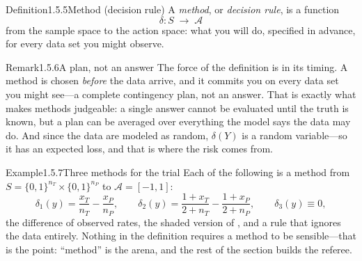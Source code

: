 \documentclass[main.tex]{subfiles}
\begin{document}
\begin{Obj}{Definition}{1.5.5}{Method (decision rule)}
A \emph{method}, or \emph{decision rule}, is a function
\[ \delta : S \;\to\; \mathcal{A} \]
from the sample space to the action space: what you will do, specified in advance, for every
data set you might observe.
\end{Obj}

\begin{ObjL}{Remark}{1.5.6}{A plan, not an answer}
The force of the definition is in its timing. A method is chosen \emph{before} the data
arrive, and it commits you on every data set you might see---a complete contingency plan, not
an answer. That is exactly what makes methods judgeable: a single answer cannot be evaluated
until the truth is known, but a plan can be averaged over everything the model says the data
may do. And since the data are modeled as random, $\delta(Y)$ is a random variable---so it has
an expected loss, and that is where the risk comes from.
\end{ObjL}

\begin{ObjL}{Example}{1.5.7}{Three methods for the trial}
Each of the following is a method from $S=\{0,1\}^{n_T}\times\{0,1\}^{n_P}$ to
$\mathcal{A}=[-1,1]$:
\[ \delta_1(y)=\frac{x_T}{n_T}-\frac{x_P}{n_P}, \qquad
   \delta_2(y)=\frac{1+x_T}{2+n_T}-\frac{1+x_P}{2+n_P}, \qquad
   \delta_3(y)\equiv 0 , \]
the difference of observed rates, the shaded version of , and a rule that ignores
the data entirely. Nothing in the definition requires a method to be sensible---that is the
point: ``method'' is the arena, and the rest of the section builds the referee.
\end{ObjL}
\end{document}
